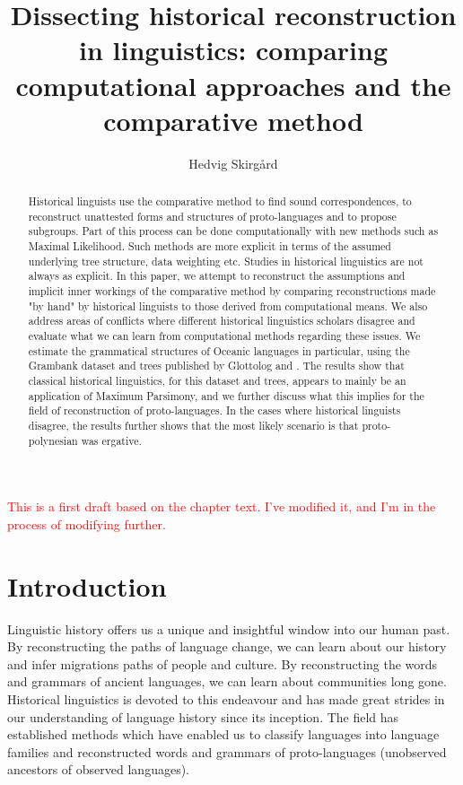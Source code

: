 \documentclass[a4paper,10pt]{article} %
\title{Dissecting historical reconstruction in linguistics: comparing computational approaches and the comparative method}
\author{Hedvig Skirg{\aa}rd}
\begin{document}
\def\code#1{\texttt{#1}}

\thispagestyle{empty}

\maketitle
\thispagestyle{empty}

\tableofcontents
\newpage

\textcolor{red}{This is a first draft based on the chapter text. I've modified it, and I'm in the process of modifying further. }



\begin{abstract}
Historical linguists use the comparative method to find sound correspondences, to reconstruct unattested forms and structures of proto-languages and to propose subgroups. Part of this process can be done computationally with new methods such as Maximal Likelihood. Such methods are more explicit in terms of the assumed underlying tree structure, data weighting etc. Studies in historical linguistics are not always as explicit. In this paper, we attempt to reconstruct the assumptions and implicit inner workings of the comparative method by comparing reconstructions made "by hand" by historical linguists to those derived from computational means. We also address areas of conflicts where different historical linguistics scholars disagree and evaluate what we can learn from computational methods regarding these issues. We estimate the grammatical structures of Oceanic languages in particular, using the Grambank dataset and trees published by Glottolog and \citet{grayetal_2009}. The results show that classical historical linguistics, for this dataset and trees, appears to mainly be an application of Maximum Parsimony, and we further discuss what this implies for the field of reconstruction of proto-languages. In the cases where historical linguists disagree, the results further shows that the most likely scenario is that proto-polynesian was ergative.
\end{abstract}
\newpage

\doublespacing
\section{Introduction}
\label{acr:intro}
Linguistic history offers us a unique and insightful window into our human past. By reconstructing the paths of language change, we can learn about our history and infer migrations paths of people and culture. By reconstructing the words and grammars of ancient languages, we can learn about communities long gone. Historical linguistics is devoted to this endeavour and has made great strides in our understanding of language history since its inception. The field has established methods which have enabled us to classify languages into language families and reconstructed words and grammars of proto-languages (unobserved ancestors of observed languages). 
\end{document}
